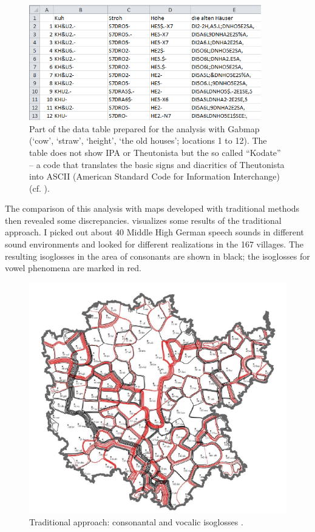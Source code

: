 \documentclass[output=paper]{LSP/langsci}
\begin{document}
\begin{figure}
\includegraphics[width=0.9\textwidth]{illustrations/mathus_fig6}
\caption{Part of the data table prepared for the analysis with Gabmap (`cow', `straw', `height', `the old houses'; locations 1 to 12).
The table does not show IPA or Theutonista but the so called ``Kodate'' – a code that translates the basic signs and diacritics of Theutonista into ASCII (American Standard Code for Information Interchange) (cf. \citealt[38--40]{reichel_elektronische_2013}).}
\label{fig:mathus:6}
\end{figure}

The comparison of this analysis with maps developed with traditional methods then revealed some discrepancies.  visualizes some results of the traditional approach. I picked out about 40 Middle High German speech sounds in different sound environments and looked for different realizations in the 167 villages. The resulting isoglosses in the area of consonants are shown in black; the isoglosses for vowel phenomena are marked in red.

\begin{figure}
\includegraphics[width=.7\textwidth]{illustrations/mathus_fig7}
\caption{Traditional approach: consonantal and vocalic isoglosses \citep[107]{mathussek_sprachraume_2014}.}
\label{fig:mathus:7}
\end{figure}
\end{document}
